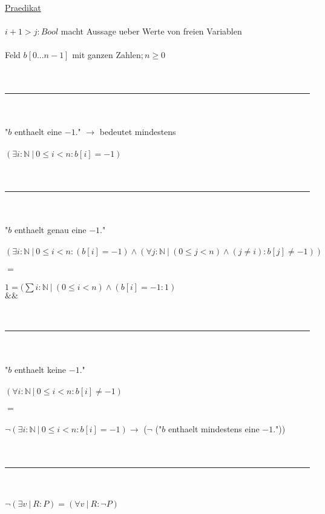 \documentclass[18pt,a4paper]{article}
\newcommand{\tab}{\hspace*{2em}}
\begin{document}
\uline{Praedikat}\\
\\
$i+1 > j : Bool$ macht Aussage ueber Werte von freien Variablen\\
\\
Feld $b[0...n-1]$ mit ganzen Zahlen$; n\geqslant 0$\\
\\
\\
\rule{\textwidth}{0.4mm}\\
\\
"$b$ enthaelt eine $-1$." $\rightarrow$ bedeutet mindestens\\
\\
$(\exists{i} : \mathbb{N} \:\vert\: 0\leqslant i < n : b[i] = -1)$\\
\\
\\
\rule{\textwidth}{0.4mm}\\
\\
"$b$ enthaelt genau eine $-1$."\\
\\
$(\exists{i} : \mathbb{N} \:\vert\: 0\leqslant i < n : (b[i] = -1) \wedge (\forall{j} : \mathbb{N} \:\vert\: (0\leqslant j < n) \wedge (j\neq i) : b[j] \neq -1 ))$\\
\\
$=$\\
\\
$1 = (\sum{i} : \mathbb{N} \:\vert\: (0\leqslant i < n) \wedge (b[i] = -1 : 1)$\\
\tab \tab \tab \tab \tab \:\:\:$\&\&$\\
\\
\\
\rule{\textwidth}{0.4mm}\\
\\
"$b$ enthaelt keine $-1$."\\
\\
$(\forall{i} : \mathbb{N} \:\vert\: 0\leqslant i < n : b[i] \neq -1)$\\
\\
$=$\\
\\
$\neg (\exists{i} : \mathbb{N} \:\vert\: 0\leqslant i < n : b[i] = -1) \rightarrow$ ($\neg$ ("$b$ enthaelt mindestens eine $-1$.")) \\
\\
\\
\rule{\textwidth}{0.4mm}\\
\\
$\neg (\exists{v} \:\vert\: R : P) = (\forall{v} \:\vert\: R : \neg P)$\\
\end{document}
